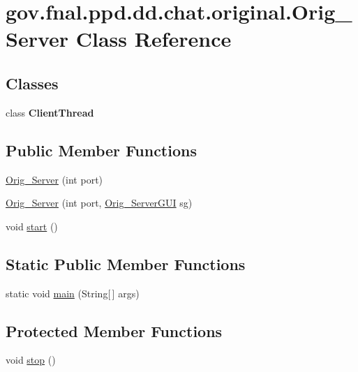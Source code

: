 \hypertarget{classgov_1_1fnal_1_1ppd_1_1dd_1_1chat_1_1original_1_1Orig__Server}{\section{gov.\-fnal.\-ppd.\-dd.\-chat.\-original.\-Orig\-\_\-\-Server Class Reference}
\label{classgov_1_1fnal_1_1ppd_1_1dd_1_1chat_1_1original_1_1Orig__Server}
}
\subsection*{Classes}
\begin{DoxyCompactItemize}
\item 
class {\bfseries Client\-Thread}
\end{DoxyCompactItemize}
\subsection*{Public Member Functions}
\begin{DoxyCompactItemize}
\item 
\hyperlink{classgov_1_1fnal_1_1ppd_1_1dd_1_1chat_1_1original_1_1Orig__Server_ae320c0c47b2ba799916e41859aaa892a}{Orig\-\_\-\-Server} (int port)
\item 
\hyperlink{classgov_1_1fnal_1_1ppd_1_1dd_1_1chat_1_1original_1_1Orig__Server_a53137e0780af9328fd9988f1b6214c7c}{Orig\-\_\-\-Server} (int port, \hyperlink{classgov_1_1fnal_1_1ppd_1_1dd_1_1chat_1_1original_1_1Orig__ServerGUI}{Orig\-\_\-\-Server\-G\-U\-I} sg)
\item 
void \hyperlink{classgov_1_1fnal_1_1ppd_1_1dd_1_1chat_1_1original_1_1Orig__Server_a4a73c0f746ec02f0cee7e19bddf15606}{start} ()
\end{DoxyCompactItemize}
\subsection*{Static Public Member Functions}
\begin{DoxyCompactItemize}
\item 
static void \hyperlink{classgov_1_1fnal_1_1ppd_1_1dd_1_1chat_1_1original_1_1Orig__Server_a9f931fc88c775c6337f90361c7f3b12a}{main} (String\mbox{[}$\,$\mbox{]} args)
\end{DoxyCompactItemize}
\subsection*{Protected Member Functions}
\begin{DoxyCompactItemize}
\item 
void \hyperlink{classgov_1_1fnal_1_1ppd_1_1dd_1_1chat_1_1original_1_1Orig__Server_ada2eb5e96b41a212ff71d282b6a947ce}{stop} ()
\end{DoxyCompactItemize}


